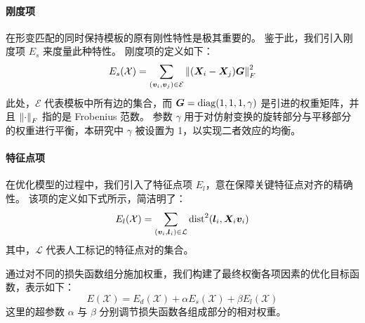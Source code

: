 \paragraph{刚度项}
在形变匹配的同时保持模板的原有刚性特性是极其重要的。
鉴于此，我们引入刚度项 $E_s$ 来度量此种特性。
刚度项的定义如下：
\begin{equation}
  E_s(\mathcal{X}) = \sum_{(\bm{v}_i, \bm{v}_j) \in \mathcal{E}} \norm{(\bm{X}_i - \bm{X}_j) \bm{G}}_F^2
\end{equation}
此处，$\mathcal{E}$ 代表模板中所有边的集合，而 $\bm{G} = \operatorname{diag}(1, 1, 1, \gamma)$ 是引进的权重矩阵，并且 $\norm{\cdot}_F$ 指的是 Frobenius 范数。
参数 $\gamma$ 用于对仿射变换的旋转部分与平移部分的权重进行平衡，本研究中 $\gamma$ 被设置为 1，以实现二者效应的均衡。

\paragraph{特征点项}
在优化模型的过程中，我们引入了特征点项 $E_l$，意在保障关键特征点对齐的精确性。
该项的定义如下式所示，简洁明了：
\begin{equation}
  E_l(\mathcal{X}) = \sum_{(\bm{v}_i, \bm{l}_i) \in \mathcal{L}} \operatorname{dist}^2(\bm{l}_i, \bm{X}_i \bm{v}_i)
\end{equation}
其中，$\mathcal{L}$ 代表人工标记的特征点对的集合。

通过对不同的损失函数组分施加权重，我们构建了最终权衡各项因素的优化目标函数，表示如下：
\begin{equation}
  E(\mathcal{X}) = E_d(\mathcal{X}) + \alpha E_s(\mathcal{X}) + \beta E_l(\mathcal{X})
\end{equation}
这里的超参数 $\alpha$ 与 $\beta$ 分别调节损失函数各组成部分的相对权重。

